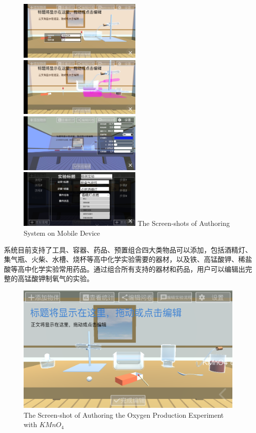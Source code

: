 \begin{figure}[!htp]
  \centering
  \includegraphics[width=6cm]{figure/objRes.jpg}
  \hspace{1cm}
    \includegraphics[width=6cm]{figure/movingRes.jpg}
    \includegraphics[width=6cm]{figure/envirRes.jpg}
  \hspace{1cm}
  \includegraphics[width=6cm]{figure/procedureRes.jpg}
    {The Screen-shots of Authoring System on Mobile Device}
 \label{fig:authorRes}
\end{figure}

系统目前支持了工具、容器、药品、预置组合四大类物品可以添加，包括酒精灯、集气瓶、火柴、水槽、烧杯等高中化学实验需要的器材，以及铁、高锰酸钾、稀盐酸等高中化学实验常用药品。通过组合所有支持的器材和药品，用户可以编辑出完整的高锰酸钾制氧气的实验。

\begin{figure}[!htp]
  \centering
  \includegraphics[width=12cm]{figure/Kmno4res.png}
    {The Screen-shot of Authoring the Oxygen Production Experiment with $KMnO_4$}
 \label{fig:authorRes}
\end{figure}



